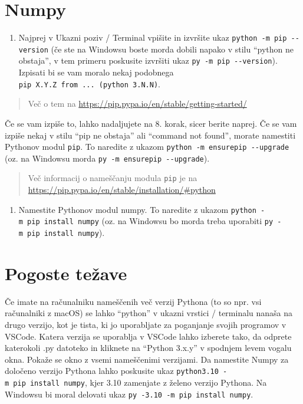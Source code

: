 \documentclass[
]{book}
\providecommand{\tightlist}{%
  \setlength{\itemsep}{0pt}\setlength{\parskip}{0pt}}
\begin{document}
\hypertarget{numpy}{%
\section{Numpy}\label{numpy}}

\begin{enumerate}
\def\labelenumi{\arabic{enumi}.}
\setcounter{enumi}{6}
\tightlist
\item
  Najprej v Ukazni poziv / Terminal vpišite in izvršite ukaz \texttt{python\ -m\ pip\ -\/-version}
  (če ste na Windowsu boste morda dobili napako v stilu ``python ne obstaja'',
  v tem primeru poskusite izvršiti ukaz \texttt{py\ -m\ pip\ -\/-version}).
  Izpisati bi se vam moralo nekaj podobnega \texttt{pip\ X.Y.Z\ from\ ...\ (python\ 3.N.N)}.
\end{enumerate}

\begin{quote}
Več o tem na \url{https://pip.pypa.io/en/stable/getting-started/}
\end{quote}

Če se vam izpiše to, lahko nadaljujete na 8. korak, sicer berite naprej.
Če se vam izpiše nekaj v stilu ``pip ne obstaja'' ali ``command not found'',
morate namestiti Pythonov modul \texttt{pip}. To naredite z ukazom
\texttt{python\ -m\ ensurepip\ -\/-upgrade} (oz. na Windowsu morda \texttt{py\ -m\ ensurepip\ -\/-upgrade}).

\begin{quote}
Več informacij o nameščanju modula \texttt{pip} je na \url{https://pip.pypa.io/en/stable/installation/\#python}
\end{quote}

\begin{enumerate}
\def\labelenumi{\arabic{enumi}.}
\setcounter{enumi}{7}
\tightlist
\item
  Namestite Pythonov modul numpy. To naredite z ukazom \texttt{python\ -m\ pip\ install\ numpy}
  (oz. na Windowsu bo morda treba uporabiti \texttt{py\ -m\ pip\ install\ numpy}).
\end{enumerate}

\hypertarget{pogoste-teux17eave}{%
\section{Pogoste težave}\label{pogoste-teux17eave}}

Če imate na računalniku nameščenih več verzij Pythona (to so npr. vsi računalniki z macOS) se lahko ``python'' v ukazni vrstici / terminalu nanaša na drugo verzijo, kot je tista, ki jo uporabljate za poganjanje svojih programov v VSCode. Katera verzija se uporablja v VSCode lahko izberete tako, da odprete katerokoli .py datoteko in kliknete na ``Python 3.x.y'' v spodnjem levem vogalu okna. Pokaže se okno z vsemi nameščenimi verzijami. Da namestite Numpy za določeno verzijo Pythona lahko poskusite ukaz \texttt{python3.10\ -m\ pip\ install\ numpy}, kjer 3.10 zamenjate z želeno verzijo Pythona. Na Windowsu bi moral delovati ukaz \texttt{py\ -3.10\ -m\ pip\ install\ numpy}.
\end{document}

